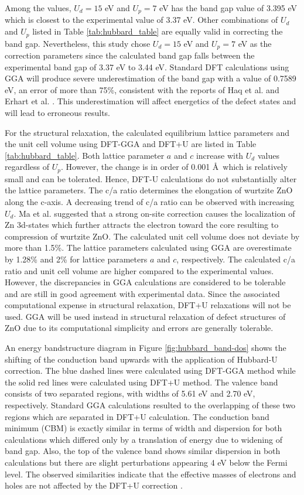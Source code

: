 Among the values, $U_d = 15$ eV and $U_p = 7$ eV has the band gap  value of 3.395 eV which is closest to the experimental value of 3.37 eV. Other combinations of $U_d$ and $U_p$ listed in Table \ref{tab:hubbard_table} are equally valid in correcting the band gap. Nevertheless, this study chose $U_d = 15$ eV and $U_p = 7$ eV as the correction parameters since the calculated band gap falls between the experimental band gap of 3.37 eV to 3.44 eV. Standard DFT calculations using GGA will produce severe underestimation of the band gap with  a value of 0.7589 eV, an error of more than 75\%, consistent with the reports of Haq et al. \citep{Haq2013} and Erhart et al. \citep{Erhart2006a}. This underestimation will affect energetics of the defect states and will lead to erroneous results.

For the structural relaxation, the calculated equilibrium lattice parameters and the unit cell volume  using DFT-GGA and DFT+U are listed in Table \ref{tab:hubbard_table}.  Both lattice parameter $a$ and $c$ increase with $U_d$ values regardless of $U_p$. However, the change is in order of 0.001 \AA \ which is relatively small and can be tolerated. Hence, DFT-U calculations do not substantially alter the lattice parameters. The c/a ratio determines the elongation of wurtzite ZnO along the c-axis. A decreasing trend of c/a ratio can be observed with increasing $U_d$. Ma et al. \citep{Ma2013} suggested that a strong on-site correction causes the localization of Zn 3d-states which further attracts the electron toward the core resulting to  compression of wurtzite ZnO. The calculated unit cell volume does not deviate by more than 1.5\%. The lattice parameters calculated using GGA are overestimate by 1.28\% and 2\% for lattice parameters $a$ and $c$, respectively. The calculated c/a ratio and unit cell volume are higher compared to the experimental values. However, the discrepancies in GGA calculations are considered to be tolerable and are still in good agreement with experimental data. Since the associated computational expense in structural relaxation, DFT+U relaxations will not be used. GGA will be used instead in structural relaxation of defect structures of ZnO  due to its computational simplicity and errors are generally tolerable.

An energy bandstructure diagram in Figure \ref{fig:hubbard_band-dos} shows the shifting of the conduction band upwards with the application of Hubbard-U correction. The blue dashed lines were calculated using DFT-GGA method while the solid red lines were calculated using DFT+U method.   The valence band consists of two separated regions, with widths of 5.61 eV and 2.70 eV, respectively. Standard GGA calculations resulted to the overlapping of these two regions  which are separated in DFT+U calculation. The conduction band minimum (CBM) is exactly similar in terms of width and dispersion for both calculations which differed only by a translation of energy due to widening of band gap. Also, the top of the valence band shows similar dispersion in both calculations but there are slight perturbations appearing 4 eV below the Fermi level. The observed similarities indicate that the effective masses of electrons and holes  are not affected by the DFT+U correction \citep{Goh2017}. 

